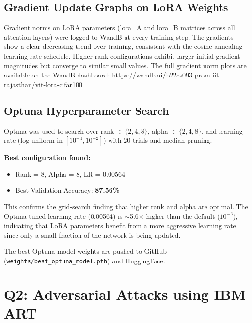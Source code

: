 \documentclass[12pt,a4paper]{article}
\begin{document}
\subsection{Gradient Update Graphs on LoRA Weights}

Gradient norms on LoRA parameters (lora\_A and lora\_B matrices across all attention layers) were logged to WandB at every training step.
The gradients show a clear decreasing trend over training, consistent with the cosine annealing learning rate schedule.
Higher-rank configurations exhibit larger initial gradient magnitudes but converge to similar small values.
The full gradient norm plots are available on the WandB dashboard:
\url{https://wandb.ai/b22cs093-prom-iit-rajasthan/vit-lora-cifar100}

\subsection{Optuna Hyperparameter Search}

Optuna was used to search over rank $\in \{2,4,8\}$, alpha $\in \{2,4,8\}$, and learning rate (log-uniform in $[10^{-4}, 10^{-2}]$) with 20 trials and median pruning.

\textbf{Best configuration found:}
\begin{itemize}
    \item Rank = 8, Alpha = 8, LR = 0.00564
    \item Best Validation Accuracy: \textbf{87.56\%}
\end{itemize}

This confirms the grid-search finding that higher rank and alpha are optimal. The Optuna-tuned learning rate (0.00564) is $\sim$5.6$\times$ higher than the default ($10^{-3}$), indicating that LoRA parameters benefit from a more aggressive learning rate since only a small fraction of the network is being updated.

The best Optuna model weights are pushed to GitHub (\texttt{weights/best\_optuna\_model.pth}) and HuggingFace.

\newpage
\section{Q2: Adversarial Attacks using IBM ART}
\end{document}

